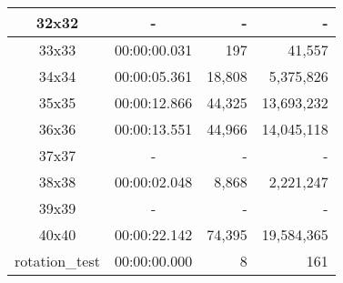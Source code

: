 \begin{center}
\begin{tabular}{|c|c|r|r|}
		32x32 & - & - & - \\ \hline
		33x33 & 00:00:00.031 & 197 & 41,557 \\ \hline
		34x34 & 00:00:05.361 & 18,808 & 5,375,826 \\ \hline
		35x35 & 00:00:12.866 & 44,325 & 13,693,232 \\ \hline
		36x36 & 00:00:13.551 & 44,966 & 14,045,118 \\ \hline
		37x37 & - & - & - \\ \hline
		38x38 & 00:00:02.048 & 8,868 & 2,221,247 \\ \hline
		39x39 & - & - & - \\ \hline
		40x40 & 00:00:22.142 & 74,395 & 19,584,365 \\ \hline
		rotation\_test & 00:00:00.000 & 8 & 161 \\ \hline

    \end{tabular}
\end{center}
